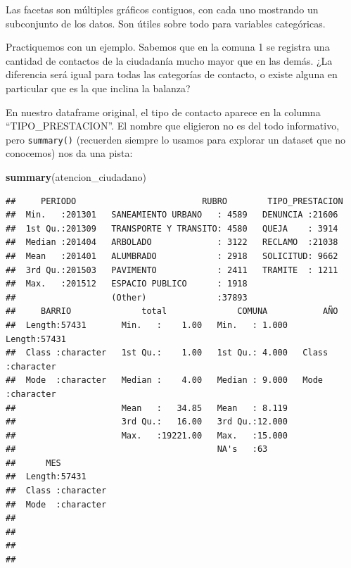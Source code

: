 \documentclass[]{book}
\newenvironment{Shaded}{\begin{snugshade}}{\end{snugshade}}
\newcommand{\KeywordTok}[1]{\textcolor[rgb]{0.13,0.29,0.53}{\textbf{#1}}}
\newcommand{\NormalTok}[1]{#1}
\begin{document}
Las facetas son múltiples gráficos contiguos, con cada uno mostrando un
subconjunto de los datos. Son útiles sobre todo para variables
categóricas.

Practiquemos con un ejemplo. Sabemos que en la comuna 1 se registra una
cantidad de contactos de la ciudadanía mucho mayor que en las demás. ¿La
diferencia será igual para todas las categorías de contacto, o existe
alguna en particular que es la que inclina la balanza?

En nuestro dataframe original, el tipo de contacto aparece en la columna
``TIPO\_PRESTACION''. El nombre que eligieron no es del todo
informativo, pero \texttt{summary()} (recuerden siempre lo usamos para
explorar un dataset que no conocemos) nos da una pista:

\begin{Shaded}
\begin{Highlighting}[]
\KeywordTok{summary}\NormalTok{(atencion_ciudadano)}
\end{Highlighting}
\end{Shaded}

\begin{verbatim}
##     PERIODO                         RUBRO        TIPO_PRESTACION 
##  Min.   :201301   SANEAMIENTO URBANO   : 4589   DENUNCIA :21606  
##  1st Qu.:201309   TRANSPORTE Y TRANSITO: 4580   QUEJA    : 3914  
##  Median :201404   ARBOLADO             : 3122   RECLAMO  :21038  
##  Mean   :201401   ALUMBRADO            : 2918   SOLICITUD: 9662  
##  3rd Qu.:201503   PAVIMENTO            : 2411   TRAMITE  : 1211  
##  Max.   :201512   ESPACIO PUBLICO      : 1918                    
##                   (Other)              :37893                    
##     BARRIO              total              COMUNA           AÑO           
##  Length:57431       Min.   :    1.00   Min.   : 1.000   Length:57431      
##  Class :character   1st Qu.:    1.00   1st Qu.: 4.000   Class :character  
##  Mode  :character   Median :    4.00   Median : 9.000   Mode  :character  
##                     Mean   :   34.85   Mean   : 8.119                     
##                     3rd Qu.:   16.00   3rd Qu.:12.000                     
##                     Max.   :19221.00   Max.   :15.000                     
##                                        NA's   :63                         
##      MES           
##  Length:57431      
##  Class :character  
##  Mode  :character  
##                    
##                    
##                    
## 
\end{verbatim}
\end{document}
